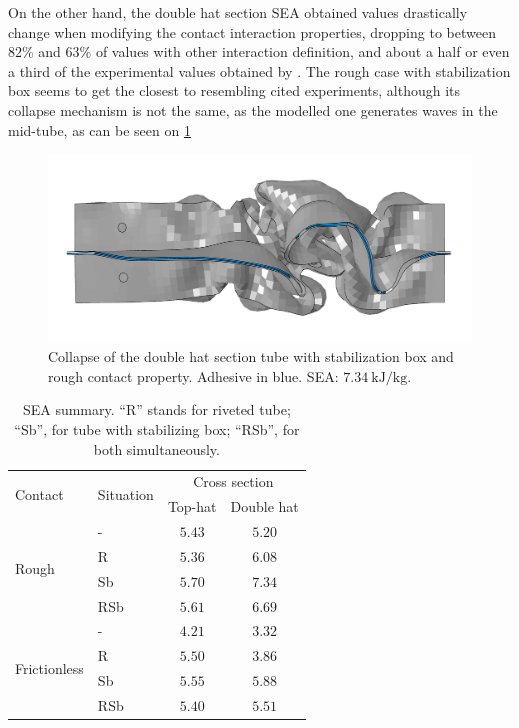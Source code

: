 \documentclass[
documentsize = a4, %
font = cmr, %
typesize = 11, %
printmode = true,
onehalfspacing = true,
language = en, %
titlepage = udciccp, %
degree = pt, %
dedication = true,
acknowledgements = true,
abstract-en = true,
abstract-es = false,
abstract-ga = false,
epigraphs = true,
toc = true,
lof = true,
lot = true,
frontmatterintoc = false,
notation = false,
minimal = false,
]{UDCthesis}
\begin{document}
On the other hand, the double hat section \gls{SEA} obtained values drastically change when modifying the contact interaction properties, dropping to between $82\%$ and $63\%$ of values with other interaction definition, and about a half or even a third of the experimental values obtained by \citet{Peroni2009}. The rough case with stabilization box seems to get the closest to resembling cited experiments, although its collapse mechanism is not the same, as the modelled one generates waves in the mid-tube, as can be seen on \cref{fig:best_B_tube}

\begin{figure}
	\centering
	\includegraphics[width=0.7\linewidth]{IMG_CUTRES/best_B_tube}
	\caption[Collapse of the double hat section tube with stabilization box and rough contact property.]{Collapse of the double hat section tube with stabilization box and rough contact property. Adhesive in blue. \Gls{SEA}: $\SI{7.34}{\kJ/\kg}$.}
	\label{fig:best_B_tube}
\end{figure}


\begin{table}[htpb]
	\centering
	\begin{tabular}{llcc}
		\toprule
		\multirow{2}{*}{Contact} & \multirow{2}{*}{Situation} & \multicolumn{2}{c}{Cross section} \\ \cmidrule{3-4}
		\multicolumn{2}{l}{}                                    & Top-hat         & Double hat     \\ \midrule
		\multirow{4}{*}{Rough}                  & -             & $5.43$          & $5.20$         \\
		& R             & $5.36$          & $6.08$          \\
		& Sb            & $5.70$          & $7.34$          \\
		& RSb           & $5.61$          & $6.69$          \\ \midrule
		\multirow{4}{*}{Frictionless}           & -             & $4.21$          & $3.32$         \\
		& R             & $5.50$          & $3.86$         \\
		& Sb            & $5.55$          & $5.88$          \\
		& RSb           & $5.40$          & $5.51$          \\ \bottomrule
	\end{tabular}
	\caption[\Acrlong{SEA} summary.]{\Acrlong{SEA} summary. ``R'' stands for riveted tube; ``Sb'', for tube with stabilizing box; ``RSb'', for both simultaneously.}
	\label{tab:sea}
\end{table}
\end{document}
